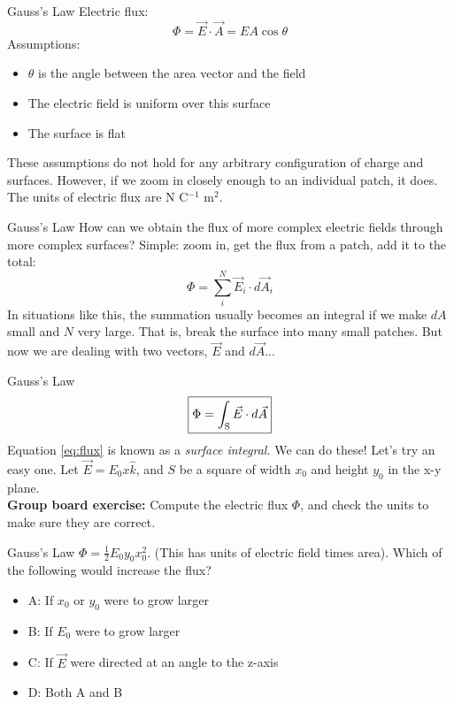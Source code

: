 \documentclass{beamer}
\begin{document}
\begin{frame}{Gauss's Law}
Electric flux:
\begin{equation}
\boxed{
\Phi = \vec{E} \cdot \vec{A}} = E A \cos\theta
\end{equation}
Assumptions:
\begin{itemize}
\item $\theta$ is the angle between the area vector and the field
\item The electric field is uniform over this surface
\item The surface is flat
\end{itemize}
These assumptions do not hold for any arbitrary configuration of charge and surfaces.  However, if we zoom in closely enough to an individual patch, it does. \\ \vspace{0.5cm}
The units of electric flux are N C$^{-1}$ m$^2$.
\end{frame}

\begin{frame}{Gauss's Law}
How can we obtain the flux of more complex electric fields through more complex surfaces?  Simple: zoom in, get the flux from a patch, add it to the total:
\begin{equation}
\Phi = \sum_i^N \vec{E}_i \cdot d\vec{A}_i
\end{equation}
In situations like this, the summation usually becomes an integral if we make $dA$ small and $N$ very large.  That is, break the surface into many small patches.  But now we are dealing with two vectors, $\vec{E}$ and $d\vec{A}$...
\end{frame}

\begin{frame}{Gauss's Law}
\begin{equation}
\boxed{
\Phi = \int_{\rm S} \vec{E} \cdot d\vec{A}} \label{eq:flux}
\end{equation}
Equation \ref{eq:flux} is known as a \textit{surface integral.}  We can do these!  Let's try an easy one.  Let $\vec{E} = E_0 x \hat{k}$, and $S$ be a square of width $x_0$ and height $y_0$ in the x-y plane. \\ \vspace{0.5cm}
\textbf{Group board exercise:} Compute the electric flux $\Phi$, and check the units to make sure they are correct.
\end{frame}

\begin{frame}{Gauss's Law}
$\Phi = \frac{1}{2} E_0 y_0 x_0^2$.  (This has units of electric field times area).  Which of the following would increase the flux?
\begin{itemize}
\item A: If $x_0$ or $y_0$ were to grow larger
\item B: If $E_0$ were to grow larger
\item C: If $\vec{E}$ were directed at an angle to the z-axis
\item D: Both A and B
\end{itemize}
\end{frame}
\end{document}
